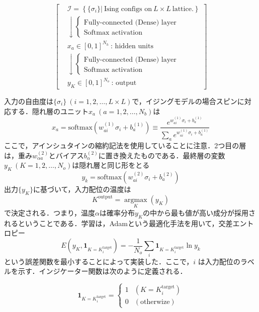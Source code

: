 \documentclass[a4paper,11pt]{jsreport}
\begin{document}
\begin{equation}
  \left[
    \begin{aligned}
       & \mathcal{I} = \left\{ \{ \sigma_i \} \Big| \ \text{Ising configs on} \ L \times L \ \text{lattice.} \right\} \\
       & \downarrow
      \begin{cases}
        \text{Fully-connected (Dense) layer} \\
        \text{Softmax activation}
      \end{cases}                                                                            \\
       & x_a \in [0,1]^{N_h} \ \text{: hidden units}                                                                  \\
       & \downarrow
      \begin{cases}
        \text{Fully-connected (Dense) layer} \\
        \text{Softmax activation}
      \end{cases}                                                                            \\
       & y_K \in [0,1]^{N_o} \ \text{: output}
    \end{aligned}
    \right]
\end{equation}

入力の自由度は$\{ \sigma_i \} \ (i=1,2,\dots,L \times L)$で，イジングモデルの場合スピンに対応する．隠れ層のユニット$x_a \ (a=1,2,\dots,N_b)$は
\begin{equation}
  x_a = \text{softmax}(w_{ai}^{(1)}\sigma_i + b_a^{(1)})
  \equiv \frac{e^{w_{ai}^{(1)}\sigma_i + b_a^{(1)}}}{\sum_a e^{w_{ai}^{(1)}\sigma_i + b_a^{(1)}}}
\end{equation}
ここで，アインシュタインの縮約記法を使用していることに注意．2つ目の層は，重み$w_{\alpha a}^{(2)}$とバイアス$b_{\alpha}^{(2)}$に置き換えたものである．最終層の変数$y_K \ (K=1,2,\dots,N_o)$は隠れ層と同じ形をとる
\begin{equation}
  y_k = \text{softmax}(w_{ai}^{(2)}\sigma_i + b_a^{(2)})
\end{equation}
出力$\{ y_K \}$に基づいて，入力配位の温度は
\begin{equation}
  K^{\text{output}} = \underset{K} {\operatorname{argmax}} (y_K)
\end{equation}
で決定される．つまり，温度$\alpha$は確率分布$y_K$の中から最も値が高い成分が採用されるということである．学習は，Adamという最適化手法を用いて，交差エントロピー
\begin{equation}
  E(y_K,\bm{1}_{K=K_i^{\text{target}}}) = - \frac{1}{N_o}\sum_i \bm{1}_{K=K_i^{\text{target}}} \ln{y_k}
\end{equation}
という誤差関数を最小することによって実装した．ここで，$i$ は入力配位のラベルを示す．インジケーター関数は次のように定義される．\par
\begin{equation}
  \bm{1}_{K=K_i^{\text{target}}} =
  \begin{cases}
    1 & (K=K_i^{\text{target}}) \\
    0 & (\text{otherwize})
  \end{cases}
\end{equation}
\end{document}
